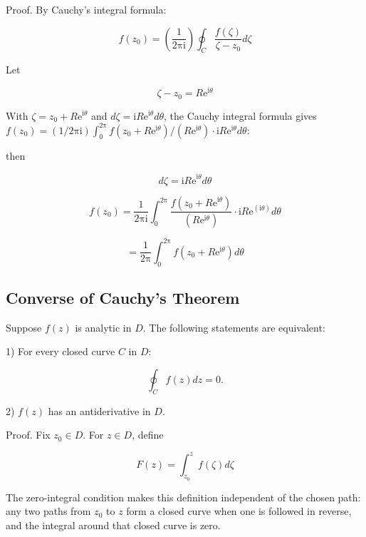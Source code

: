 \documentclass[11pt,a4paper]{article}
\theoremstyle{definition}
\theoremstyle{plain}
\begin{document}
Proof. By Cauchy's integral formula:

\begin{equation}
f(z_{0}) = \left(\frac{1}{2\mathrm{\pi}\mathrm{i}}\right)\oint_{C}\frac{f(\zeta)}{\zeta - z_{0}}d\zeta
\end{equation}

Let

\begin{equation}
\zeta - z_{0} = R\mathrm{e}^{\mathrm{i}\theta}
\end{equation}

With $\zeta = z_{0} + R\mathrm{e}^{\mathrm{i}\theta}$ and $d\zeta = \mathrm{i}R\mathrm{e}^{\mathrm{i}\theta}d\theta$, the Cauchy integral formula gives $f(z_{0}) = (1/2\mathrm{\pi}\mathrm{i})\int_{0}^{2\mathrm{\pi}}f(z_{0} + R\mathrm{e}^{\mathrm{i}\theta})/(R\mathrm{e}^{\mathrm{i}\theta}) \cdot \mathrm{i}R\mathrm{e}^{\mathrm{i}\theta}d\theta$:

then

\begin{equation}
d\zeta = {\mathrm{i}R\mathrm{e}}^{\mathrm{i}\theta}d\theta
\end{equation}

\[
f(z_{0}) = \frac{1}{2\mathrm{\pi}\mathrm{i}}\int_{0}^{2\mathrm{\pi}}\frac{f(z_{0} + R\mathrm{e}^{\mathrm{i}\theta})}{(R\mathrm{e}^{\mathrm{i}\theta})} \cdot \mathrm{i}R\mathrm{e}^{(\mathrm{i}\theta)}d\theta
\]

\[
= \frac{1}{2\mathrm{\pi}}\int_{0}^{2\mathrm{\pi}}f(z_{0} + R\mathrm{e}^{\mathrm{i}\theta})d\theta
\]

\subsection{Converse of Cauchy's Theorem}

Suppose $f(z)$ is analytic in $D$. The following statements are equivalent:

1) For every closed curve $C$ in $D$:

\begin{equation}
\oint_{C}f(z)dz = 0.
\end{equation}

2) $f(z)$ has an antiderivative in $D$.

Proof. Fix $z_{0} \in D$. For $z \in D$, define

\begin{equation}
F(z) = \int_{z_{0}}^{z}f(\zeta)d\zeta
\end{equation}

The zero-integral condition makes this definition independent of the chosen path: any two paths from $z_{0}$ to $z$ form a closed curve when one is followed in reverse, and the integral around that closed curve is zero.
\end{document}
